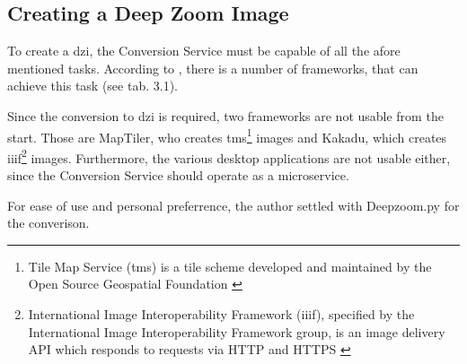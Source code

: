 \subsection{Creating a Deep Zoom Image}

To create a dzi, the Conversion Service must be capable of all the afore mentioned tasks. According to \cite{web:openseadragon}, there is a number of frameworks, that can achieve this task (see tab. 3.1).

Since the conversion to dzi is required, two frameworks are not usable from the start. Those are MapTiler, who creates tms\footnote{Tile Map Service (tms) is a tile scheme developed and maintained by the Open Source Geospatial Foundation \cite{web:tms}} images and Kakadu, which creates iiif\footnote{International Image Interoperability Framework (iiif), specified by the International Image Interoperability Framework group, is an image delivery API which responds to requests via HTTP and HTTPS \cite{web:iiif}} images. Furthermore, the various desktop applications are not usable either, since the Conversion Service should operate as a microservice.

For ease of use and personal preferrence, the author settled with Deepzoom.py for the converison.\newpage

